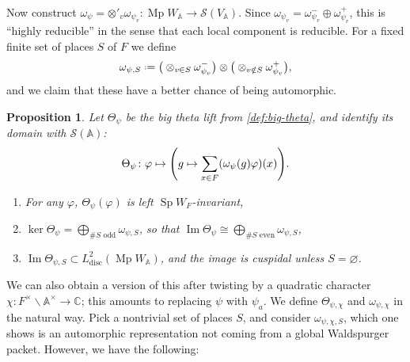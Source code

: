 \documentclass[11pt,a4paper,leqno]{article}
\let\mc\mathcal
\newcommand{\A}{\mathbb{A}}
\newcommand{\1}{\mathbbm{1}}
\newcommand{\C}{\mathbb{C}}
\newcommand*{\defeq}{\mathrel{\vcenter{\baselineskip0.5ex \lineskiplimit0pt
      \hbox{\scriptsize.}\hbox{\scriptsize.}}}%
  =}
\renewcommand{\phi}{\varphi}
\renewcommand{\emptyset}{\varnothing}
\DeclareMathOperator{\disc}{disc}
\DeclareMathOperator{\Sp}{Sp}
\DeclareMathOperator{\Mp}{Mp}
\DeclareMathOperator{\im}{Im}
\theoremstyle{plain}
\newtheorem{prop}[theorem]{Proposition}
\theoremstyle{definition}
\theoremstyle{remark}
\numberwithin{equation}{section}
\begin{document}
Now construct $\omega_{\psi} = \otimes'_{v} \omega_{\psi_{v}} \colon \Mp W_{\A} \to \mc
S(V_{\A})$. Since $\omega_{\psi_{v}} = \omega_{\psi_{v}}^{-} \oplus \omega_{\psi_{v}}^{+}$, this is
``highly reducible'' in the sense that each local component is
reducible. For a fixed finite set of places $S$ of $F$ we define 
\begin{equation}
  \label{eq:26}
\omega_{\psi,S}
\defeq \big(\otimes_{v \in S} \omega_{\psi_{v}}^{-}\big) \otimes \big(\otimes_{v \notin S} \omega_{\psi_{v}}^{+}\big),
\end{equation}
and we claim that these have a better chance of being automorphic.

\begin{prop}
  Let $\Theta_{\psi}$ be the big theta lift from \cref{def:big-theta}, and
  identify its domain with $\mc S(\A)$:
  \begin{equation}
    \label{eq:27}
\Theta_{\psi} \colon \phi \mapsto \qty(g \mapsto \sum_{x \in F} (\omega_{\psi}(g)\phi )(x)).
  \end{equation}

  \begin{enumerate}
  \item For any $\phi$, $\Theta_{\psi}(\phi)$ is left $\Sp W_{F}$-invariant,
  \item $\ker \Theta_{\psi} = \bigoplus_{\# S \text{ odd}}\omega_{\psi,S}$, so that
    $\im \Theta_{\psi} \cong \bigoplus_{\# S \text{ even}} \omega_{\psi,S}$,
  \item $\im \Theta_{\psi,S} \subset L^{2}_{\disc}(\Mp W_{\A})$, and the image is
    cuspidal unless $S = \emptyset$.
 \end{enumerate}
\end{prop}
We can also obtain a version of this after twisting by a quadratic character
$\chi\colon F^{\times}\backslash \A^{\times} \to \C$; this amounts to replacing $\psi$ with $\psi_{a}$. We define $\Theta_{\psi,\chi}$
and $\omega_{\psi,\chi}$ in the natural way. Pick a nontrivial set of places $S$,
and consider $\omega_{\psi,\chi,S}$, which one shows is an automorphic
representation not coming from a global Waldspurger packet. However,
we have the following:
\end{document}
